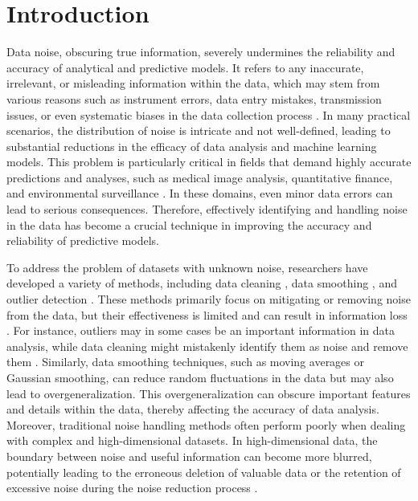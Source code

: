 \documentclass[final,3p,times]{elsarticle}
\begin{document}

\section{Introduction}
Data noise, obscuring true information, severely 
undermines the reliability and accuracy of analytical and predictive 
models. It refers to any inaccurate, irrelevant, or misleading 
information within the data, which may stem from various reasons such 
as instrument errors, data entry mistakes, transmission issues, or even 
systematic biases in the data collection process \cite{bib1,bib2,bib3}. In many practical 
scenarios, the distribution of noise is intricate and not well-defined, 
leading to substantial reductions in the efficacy of data analysis 
and machine learning models. This problem is particularly critical 
in fields that demand highly accurate predictions and analyses, 
such as medical image analysis, quantitative finance, and 
environmental surveillance \cite{bib4,bib5,bib6}. In these domains, even minor data 
errors can lead to serious consequences. Therefore, effectively 
identifying and handling noise in the data has become a crucial 
technique in improving the accuracy and reliability of predictive 
models.

To address the problem of datasets with unknown noise, researchers 
have developed a variety of methods, including data cleaning \cite{bib7,bib8}, 
data smoothing \cite{bib9,bib10,bib11}, and outlier detection \cite{bib12,bib13}. These methods 
primarily focus on mitigating or removing noise from the data, but 
their effectiveness is limited and can result in information loss \cite{bib14}. 
For instance, outliers may in some cases be an important information 
in data analysis, while data cleaning might mistakenly identify them 
as noise and remove them \cite{bib15}. Similarly, data smoothing techniques, 
such as moving averages or Gaussian smoothing, can reduce random 
fluctuations in the data but may also lead to overgeneralization. 
This overgeneralization can obscure important features and details 
within the data, thereby affecting the accuracy of data analysis. 
Moreover, traditional noise handling methods often perform poorly 
when dealing with complex and high-dimensional datasets. In 
high-dimensional data, the boundary between noise and useful 
information can become more blurred, potentially leading to the erroneous deletion 
of valuable data or the retention of excessive noise during the noise 
reduction process \cite{bib16}.
\end{document}
